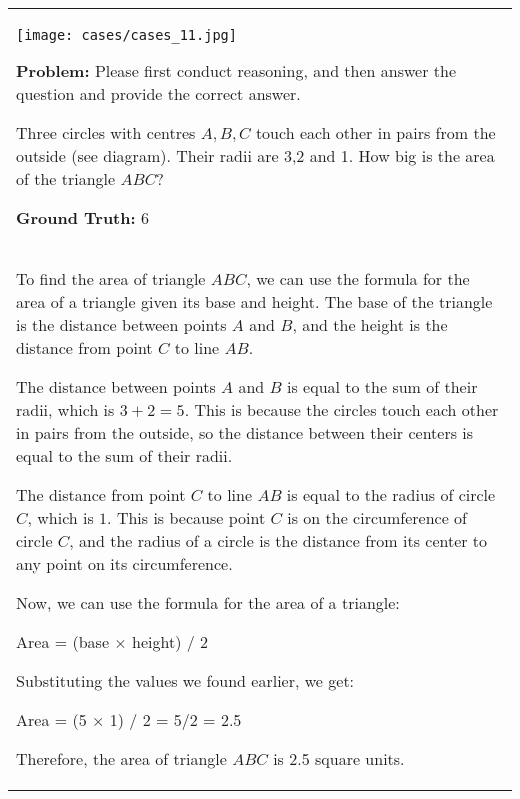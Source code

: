 \begin{table*}[htbp]
    \centering
    \renewcommand{\arraystretch}{1.2} 
    \setlength{\tabcolsep}{8pt} 
    \begin{tabular}{p{14cm}}
        \centering
        \texttt{[image: cases/cases\_11.jpg]}
        
        \begin{tcolorbox}[colback=gray!5, colframe=gray!40, sharp corners, width=\linewidth, boxrule=0.5mm]
        \small
        \textbf{Problem: }
        Please first conduct reasoning, and then answer the question and provide the correct answer.
        
        Three circles with centres $A, B, C$ touch each other in pairs from the outside (see diagram). Their radii are 3,2 and 1. How big is the area of the triangle $A B C$?

        \textbf{Ground Truth:} 6
        \end{tcolorbox}  %
        \begin{tcolorbox}[colback=gray!5, colframe=gray!40, sharp corners, width=\linewidth, boxrule=0.5mm]
            \small
            \textbf{LLaMA-3.2-Vision-11B:}
            \\
To find the area of triangle $ABC$, we can use the formula for the area of a triangle given its base and height. The base of the triangle is the distance between points $A$ and $B$, and the height is the distance from point $C$ to line $AB$.

The distance between points $A$ and $B$ is equal to the sum of their radii, which is $3 + 2 = 5$. This is because the circles touch each other in pairs from the outside, so the distance between their centers is equal to the sum of their radii.

The distance from point $C$ to line $AB$ is equal to the radius of circle $C$, which is $1$. This is because point $C$ is on the circumference of circle $C$, and the radius of a circle is the distance from its center to any point on its circumference.

Now, we can use the formula for the area of a triangle:

Area = (base × height) / 2

Substituting the values we found earlier, we get:

Area = (5 × 1) / 2
= 5/2
= 2.5

Therefore, the area of triangle $ABC$ is 2.5 square units.


\end{tcolorbox}
\end{tabular}
\end{table*}
